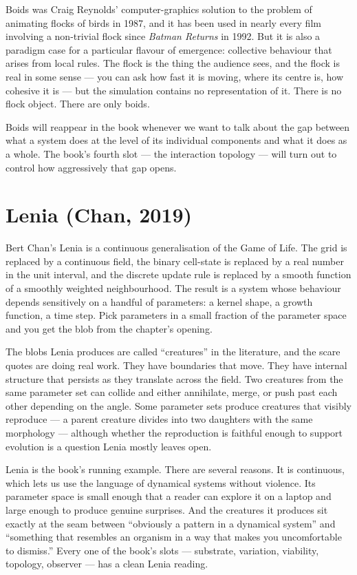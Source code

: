 Boids was Craig Reynolds' computer-graphics solution to the problem of
animating flocks of birds in 1987, and it has been used in nearly every
film involving a non-trivial flock since \textit{Batman Returns} in
1992. But it is also a paradigm case for a particular flavour of
emergence: collective behaviour that arises from local rules. The flock
is the thing the audience sees, and the flock is real in some sense ---
you can ask how fast it is moving, where its centre is, how cohesive it
is --- but the simulation contains no representation of it. There is no
flock object. There are only boids.

Boids will reappear in the book whenever we want to talk about the gap
between what a system does at the level of its individual components
and what it does as a whole. The book's fourth slot --- the interaction
topology --- will turn out to control how aggressively that gap opens.

\section{Lenia (Chan, 2019)}

Bert Chan's Lenia is a continuous generalisation of the Game of Life.
The grid is replaced by a continuous field, the binary cell-state is
replaced by a real number in the unit interval, and the discrete update
rule is replaced by a smooth function of a smoothly weighted
neighbourhood. The result is a system whose behaviour depends
sensitively on a handful of parameters: a kernel shape, a growth
function, a time step. Pick parameters in a small fraction of the
parameter space and you get the blob from the chapter's opening.

The blobs Lenia produces are called ``creatures'' in the literature,
and the scare quotes are doing real work. They have boundaries that
move. They have internal structure that persists as they translate
across the field. Two creatures from the same parameter set can collide
and either annihilate, merge, or push past each other depending on the
angle. Some parameter sets produce creatures that visibly reproduce
--- a parent creature divides into two daughters with the same
morphology --- although whether the reproduction is faithful enough to
support evolution is a question Lenia mostly leaves open.

Lenia is the book's running example. There are several reasons. It is
continuous, which lets us use the language of dynamical systems without
violence. Its parameter space is small enough that a reader can explore
it on a laptop and large enough to produce genuine surprises. And the
creatures it produces sit exactly at the seam between ``obviously a
pattern in a dynamical system'' and ``something that resembles an
organism in a way that makes you uncomfortable to dismiss.'' Every one
of the book's slots --- substrate, variation, viability, topology,
observer --- has a clean Lenia reading.

